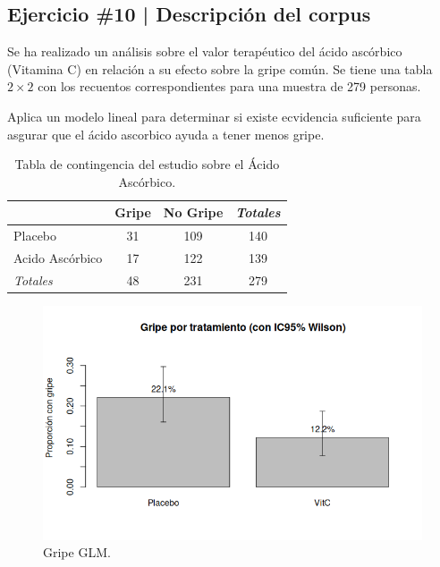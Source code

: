 \newpage

\begin{myblock}
\section*{Ejercicio \#10 | Descripción del corpus}

Se ha realizado un análisis sobre el valor terapéutico del ácido ascórbico (Vitamina C) en relación
a su efecto sobre la gripe común. Se tiene una tabla $2 \times 2$ con los recuentos
correspondientes para una muestra de 279 personas.

Aplica un modelo lineal para determinar si existe ecvidencia suficiente para asgurar que el ácido 
ascorbico ayuda a tener menos gripe. 

\end{myblock}


\begin{table}[h!]
\centering
\caption{Tabla de contingencia del estudio sobre el Ácido Ascórbico.}
\label{tab:gripe}
\begin{tabular}{l|cc|c}
\multicolumn{1}{c}{} & \textbf{Gripe} & \textbf{No Gripe} & \textit{Totales} \\
\hline
Placebo             & 31 & 109 & 140 \\
Acido Asc\'{o}rbico & 17 & 122 & 139 \\
\hline
\textit{Totales}    & 48 & 231 & 279 \\
\end{tabular}
\end{table}


\begin{figure}[h!]
    \centering
    \includegraphics[width=0.7\linewidth]{Images/gripe-p10.png}
    \caption{Gripe GLM.}
    \label{fig:gripe-10}
\end{figure}


